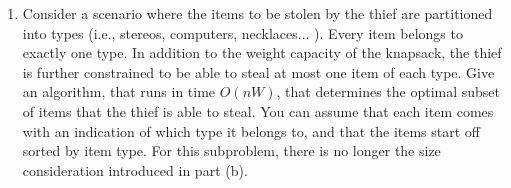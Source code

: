 \documentclass[11pt]{article}
\begin{document}
\begin{description}
\begin{enumerate}
\item Consider a scenario where the items to be stolen by the thief are partitioned into types
(i.e., stereos, computers, necklaces... ). Every item belongs to exactly one type. In addition to
the weight capacity of the knapsack, the thief is further constrained to be able to steal at most
one item of each type. Give an algorithm, that runs in time $O(nW)$, that determines the optimal
subset of items that the thief is able to steal. You can assume that each item comes with an
indication of which type it belongs to, and that the items start off sorted by item type. For this
subproblem, there is no longer the size consideration introduced in part (b).

\begin{comment}
---------------------------------

 \noindent \textbf{Solution:}

Suppose the items are partitioned into $m$ types and each type is assigned an integral \emph{type
ID} between $1$ and $m$.  Define function $f:Z_n \rightarrow Z_m$ such that $f(i)$ is the type ID
of item $i$.  This takes $O(n)$ time.  Items are sorted by their type IDs.  We define an array
$first[1..m]$ such that $first[k]$ records the index of the first item of type $k$ in the sorted
list.  This takes $O(n)$ time.  To enforce that at most one item of each type can be selected, our dynamic programming algorithm runs as follows.\\

\[i\geq1 \textrm{  :  } knap(i,j)=\left\{\begin{array}{ll} max\{knap(i-1,j),knap(first[f(i)]-1,j-w_i)+v_i\} & w_i\leq j\\ knap(i-1,j) & w_i>j

\end{array}\right.\]

\[i=0 \textrm{  :  } knap(i,j)=0\]

Here we are filling the same $n \times W$ table.  So the running time is still $O(nW)$.
---------------------------
\end{comment}


\end{enumerate}


\end{description}
\end{document}

